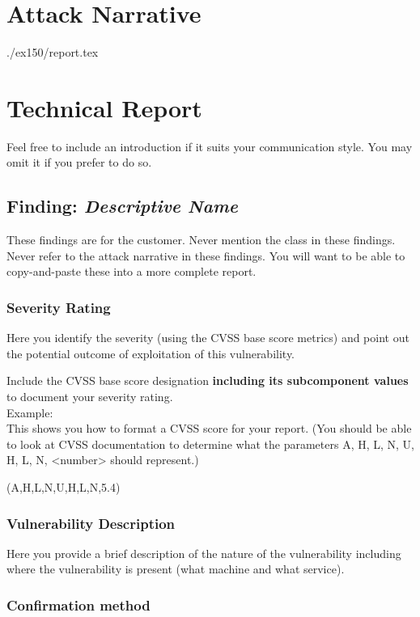 \section{Attack Narrative}
./ex150/report.tex

\section{Technical Report}

Feel free to include an introduction if it suits your communication style.
You may omit it if you prefer to do so.


  \subsection{Finding: \emph{Descriptive Name}}
  
    These findings are for the customer.
    Never mention the class in these findings.
    Never refer to the attack narrative in these findings.
    You will want to be able to copy-and-paste these into a more complete report.

	\subsubsection*{Severity Rating}
		Here you identify the severity (using the CVSS base score metrics)
		and point out the potential outcome of exploitation of this
		vulnerability.

		Include the CVSS base score designation \textbf{including its
		subcomponent values} to document your	severity rating.\\
		Example: \\
	   	This shows you how to format a CVSS score for your report.
	   	(You should be able to look at CVSS documentation to
	   	determine what the parameters A, H, L, N, U, H, L, N,
	   	<number> should represent.)
	   	
	    
		\cvss(A,H,L,N,U,H,L,N,5.4)
		
  	\subsubsection*{Vulnerability Description}
  		Here you provide a brief description of the nature of the vulnerability
  		including where the vulnerability is present (what machine and
  		what service).
  		
  	\subsubsection*{Confirmation method}
  	
